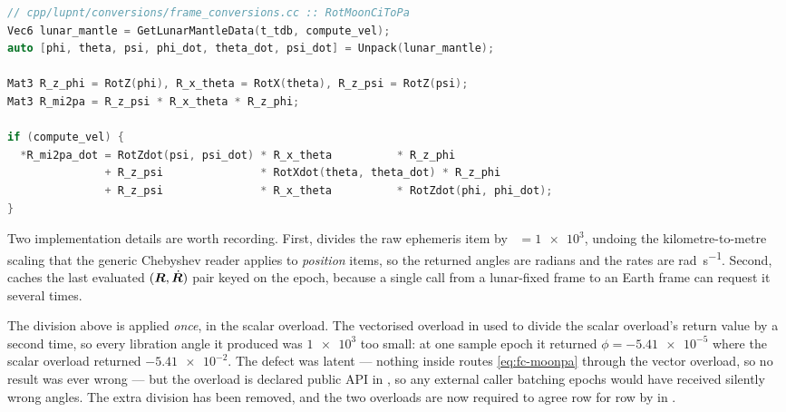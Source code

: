 \begin{lstlisting}[language=cpp, caption={Lunar libration rotation and its
  analytic derivative
  (\texttt{cpp/lupnt/conversions/frame\_conversions.cc}).},
  label={lst:fc-moonpa}]
// cpp/lupnt/conversions/frame_conversions.cc :: RotMoonCiToPa
Vec6 lunar_mantle = GetLunarMantleData(t_tdb, compute_vel);
auto [phi, theta, psi, phi_dot, theta_dot, psi_dot] = Unpack(lunar_mantle);

Mat3 R_z_phi = RotZ(phi), R_x_theta = RotX(theta), R_z_psi = RotZ(psi);
Mat3 R_mi2pa = R_z_psi * R_x_theta * R_z_phi;

if (compute_vel) {
  *R_mi2pa_dot = RotZdot(psi, psi_dot) * R_x_theta          * R_z_phi
               + R_z_psi               * RotXdot(theta, theta_dot) * R_z_phi
               + R_z_psi               * R_x_theta          * RotZdot(phi, phi_dot);
}
\end{lstlisting}

Two implementation details are worth recording. First,
 divides the raw ephemeris item by
~$=\num{1e3}$, undoing the kilometre-to-metre scaling that the
generic Chebyshev reader applies to \emph{position} items, so the returned
angles are radians and the rates are \si{\radian\per\second}. Second,
 caches the last evaluated $(\bm{R},\dot{\bm{R}})$ pair
keyed on the epoch, because a single  call from a
lunar-fixed frame to an Earth frame can request it several times.

\begin{lupntnote}
  The  division above is applied \emph{once}, in the scalar
   overload. The vectorised overload
   in
   used to divide the scalar overload's
  return value by  a second time, so every libration angle it
  produced was $\num{1e3}$ too small: at one sample epoch it returned
  $\phi = \num{-5.41e-5}$ where the scalar overload returned
  $\num{-5.41e-2}$. The defect was latent --- nothing inside \lupnt{} routes
  \cref{eq:fc-moonpa} through the vector overload, so no 
  result was ever wrong --- but the overload is declared public API in
  , so any external caller batching
  epochs would have received silently wrong angles. The
  extra division has been removed, and the two overloads are now required to
  agree row for row by
   in
  .
\end{lupntnote}


